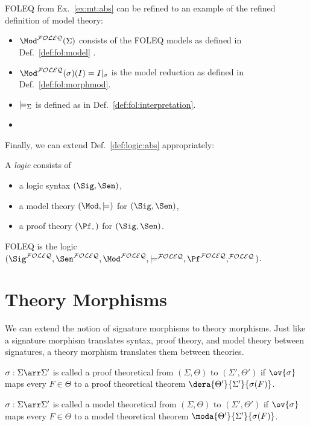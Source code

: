 \begin{example}\label{ex:mt:absmor}
FOLEQ from Ex.~\ref{ex:mt:abs} can be refined to an example of the refined definition of model theory:
  \begin{itemize}
   \item $\Mod^{\FOLEQ}(\Sigma)$ consists of the FOLEQ models as defined in Def.~\ref{def:fol:model} .
   \item $\Mod^{\FOLEQ}(\sigma)(I)=\reduce{\sigma}{I}$ is the model reduction as defined in Def.~\ref{def:fol:morphmod}.
   \item $\models_\Sigma$ is defined as in Def.~\ref{def:fol:interpretation}.
   \item {}
  \end{itemize}
\end{example}
\medskip

Finally, we can extend Def.~\ref{def:logic:abs} appropriately:
\begin{definition}[Logic]\label{def:logic:absmor}
A \emph{logic} consists of
\begin{itemize}
	\item a logic syntax $(\Sig,\Sen)$,
	\item a model theory $(\Mod,\md)$ for $(\Sig,\Sen)$,
	\item a proof theory $(\Pf,\val)$ for $(\Sig,\Sen)$.
\end{itemize}
\end{definition}

\begin{example}\label{ex:logic:absmor}
FOLEQ is the logic $(\Sig^{\FOLEQ},\Sen^{\FOLEQ},\Mod^{\FOLEQ},\md^{\FOLEQ},\Pf^{\FOLEQ},\val^{\FOLEQ})$.
\end{example}


\section{Theory Morphisms}

We can extend the notion of signature morphisms to theory morphisms. Just like a signature morphism translates syntax, proof theory, and model theory between signatures, a theory morphism translates them between theories.

\begin{definition}\label{def:fol:theomorph}
$\sigma:\Sigma\arr\Sigma'$ is called a proof theoretical  from $(\Sigma,\Theta)$ to $(\Sigma',\Theta')$ if $\ov{\sigma}$ maps every $F\in\Theta$ to a proof theoretical theorem $\dera{\Theta'}{\Sigma'}{\sigma(F)}$.

$\sigma:\Sigma\arr\Sigma'$ is called a model theoretical  from $(\Sigma,\Theta)$ to $(\Sigma',\Theta')$ if $\ov{\sigma}$ maps every $F\in\Theta$ to a model theoretical theorem $\moda{\Theta'}{\Sigma'}{\sigma(F)}$.
\end{definition}

